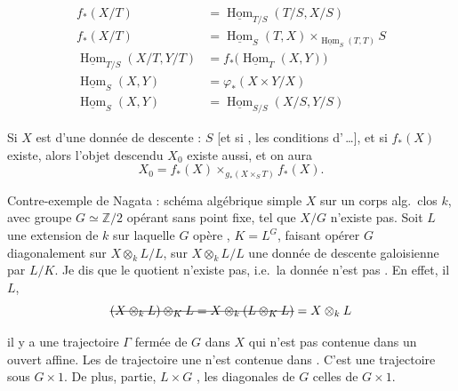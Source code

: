 \documentclass[11pt,a4paper]{article}
\begin{document}

\begin{align*}
f_*(X/T) &= \underline{\operatorname{Hom}}_{T/S}(T/S, X/S) \\
f_*(X/T) &= \underline{\operatorname{Hom}}_S(T,X) \times_{\underline{\operatorname{Hom}}_S(T,T)} S \\
\underline{\operatorname{Hom}}_{T/S}(X/T, Y/T) &= f_*\bigl(\underline{\operatorname{Hom}}_T(X,Y)\bigr) \\
\underline{\operatorname{Hom}}_S(X,Y) &= \varphi_*(X \times Y / X) \\
\underline{\operatorname{Hom}}_S(X,Y) &= \underline{\operatorname{Hom}}_{S/S}(X/S, Y/S)
\end{align*}

Si $X$ est  d'une donnée de descente : $S$
[et si  , les conditions d'\,…],
et si $f_*(X)$ existe, alors l'objet descendu $X_0$ existe aussi, et on aura
\[
X_0 = f_*(X) \times_{g_*(X \times_S T)} f_*(X) .
\]

Contre-exemple de Nagata : schéma algébrique simple $X$
 sur un corps alg.\ clos $k$, avec groupe $G \simeq \mathbb{Z}/2$
opérant sans point fixe, tel que $X/G$ n'existe pas. Soit $L$ une extension
de $k$ sur laquelle $G$ opère \struck{\ill{}} ,
 $K = L^G$, faisant opérer $G$ diagonalement sur
$X \otimes_k L / L$, \ill{} \ill{} \ill{} sur $X \otimes_k L/L$ une
donnée de descente galoisienne par $L/K$. Je
dis que le quotient n'existe pas, i.e.\ la donnée
n'est pas . En effet, 
il 
 \ill{} $L$,
\[
\text{\struck{$(X\otimes_k L)\otimes_K L = X\otimes_k(L\otimes_K L)$}} = X\otimes_k L
\]

il y a  une trajectoire $\Gamma$
fermée de $G$ dans $X$ qui n'est pas
contenue dans un ouvert affine. Les \ill{}
 de \ill{} \ill{} trajectoire
   \add{\ill{}} une
 \add{\ill{}} \ill{}
n'est contenue dans  \ill{} \ill{} \ill{}. C'est une trajectoire sous $G \times 1$.
De plus,   partie, $L \times G$ 
,  les  \struck{\ill{}}
diagonales de $G$ \ill{} \ill{} celles de $G \times 1$.
\end{document}
